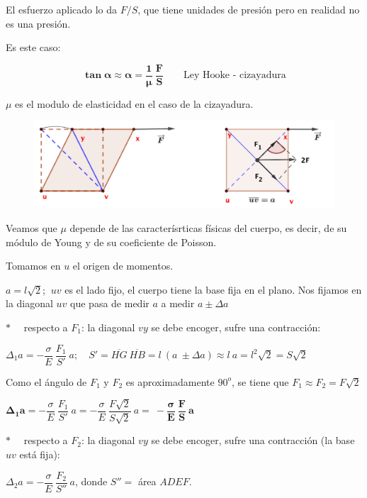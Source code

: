  El esfuerzo aplicado lo da $F/S$, que tiene unidades de presión pero en realidad no es una presión.
 
 Es este caso:
 
 \begin{equation}
 \boldsymbol{\tan \alpha \approx \alpha = \dfrac 1 \mu \  \dfrac F S} \qquad \text{Ley Hooke - cizayadura}	
\end{equation}

$\mu$ es el modulo de elasticidad en el caso de la cizayadura.

\begin{figure}[H]
	\centering
	\includegraphics[width=1\textwidth]{imagenes/imagenes09/T09IM05.png}
\end{figure}

Veamos que $\mu$ depende de las caracterísrticas físicas del cuerpo, es decir, de su módulo de Young y de su coeficiente de Poisson.

Tomamos en $u$ el origen de momentos.

$a=l\sqrt 2$; $\ uv$ es el lado fijo, el cuerpo tiene la base fija en el plano. Nos fijamos en la diagonal $uv$ que pasa de medir $a$ a medir $a \pm \Delta a$

$\ast \quad$ respecto a $F_1$: la diagonal $vy$ se debe encoger, sufre una contracción:

$\Delta_1 a=-\dfrac \sigma E \ \dfrac {F_1}{S'} \ a; \quad S'=\overline{HG}\ \overline{HB}=l\ (a\ \pm \Delta a)\approx l\ a=l^2\sqrt 2=S \sqrt 2$ 

Como el ángulo de $F_1$ y $F_2$ es aproximadamente $90^o$, se tiene que $F_1\approx F_2=F\sqrt 2$

$\boldsymbol{\Delta_1 a}=-\dfrac \sigma E \ \dfrac {F_1} {S'} \ a = -\dfrac \sigma E \ \dfrac{F \sqrt 2}{S \sqrt 2} \ a =\boldsymbol{\ - \dfrac \sigma E \ \dfrac {F}{S} \ a}$

$\ast \quad$ respecto a $F_2$: la diagonal $vy$ se debe encoger, sufre una contracción (la base $uv$ está fija):

$\Delta_2 a=-\dfrac \sigma E\ \dfrac{F_2}{S''} \ a$, donde $S''=$ área $ADEF$.

